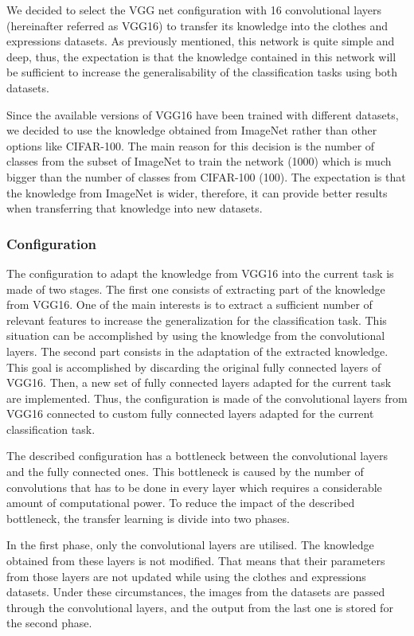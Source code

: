 \documentclass{article}
\begin{document}
We decided to select the VGG net configuration with 16 convolutional layers (hereinafter referred as VGG16) to transfer its knowledge into the clothes and expressions datasets. As previously mentioned, this network is quite simple and deep, thus, the expectation is that the knowledge contained in this network will be sufficient to increase the generalisability of the classification tasks using both datasets.

Since the available versions of VGG16 have been trained with different datasets, we decided to use the knowledge obtained from ImageNet rather than other options like CIFAR-100. The main reason for this decision is the number of classes from the subset of ImageNet to train the network (1000) which is much bigger than the number of classes from CIFAR-100 (100). The expectation is that the knowledge from ImageNet is wider, therefore, it can provide better results when transferring that knowledge into new datasets.


\subsubsection{\textbf{Configuration}}

The configuration to adapt the knowledge from VGG16 into the current task is made of two stages. The first one consists of extracting part of the knowledge from VGG16. One of the main interests is to extract a sufficient number of relevant features to increase the generalization for the classification task. This situation can be accomplished by using the knowledge from the convolutional layers. The second part consists in the adaptation of the extracted knowledge. This goal is accomplished by discarding the original fully connected layers of VGG16. Then, a new set of fully connected layers adapted for the current task are implemented. Thus, the configuration is made of the convolutional layers from VGG16 connected to custom fully connected layers adapted for the current classification task.

The described configuration has a bottleneck between the convolutional layers and the fully connected ones. This bottleneck is caused by the number of convolutions that has to be done in every layer which requires a considerable amount of computational power. To reduce the impact of the described bottleneck, the transfer learning is divide into two phases.

In the first phase, only the convolutional layers are utilised. The knowledge obtained from these layers is not modified. That means that their parameters from those layers are not updated while using the clothes and expressions datasets. Under these circumstances, the images from the datasets are passed through the convolutional layers, and the output from the last one is stored for the second phase.
\end{document}
